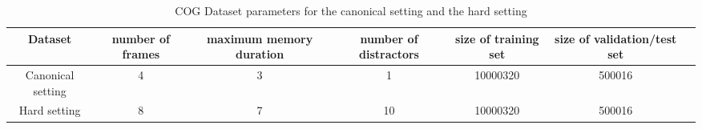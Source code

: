 \begin{table}[!t]
\caption{COG Dataset parameters for the canonical setting and the hard setting  }
\centering
\begin{adjustbox}{width=\textwidth}
\begin{tabular}{ccccccc}
	\toprule
	
	Dataset    &  	number of frames  &  	maximum memory duration & number of distractors & size of training set & size of validation/test set    \\ 
	\midrule
	
	Canonical setting & 4 & 3 & 1 & 10000320 & 500016 &   \\
	\midrule
	
	Hard  setting & 8 & 7& 10 & 10000320 & 500016  \\
	\bottomrule	
\end{tabular}
\end{adjustbox}
\label{tab:parameters}
\end{table}


